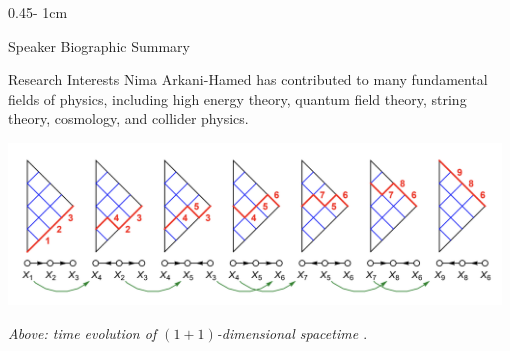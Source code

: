 \documentclass{psuposter}
\begin{document}
\begin{frame}
\begin{columns}[onlytextwidth]
\begin{column}{0.45\textwidth - 1cm}
\begin{block}{Speaker Biographic Summary}
    \end{block}
%
%
%

    \begin{block}{Research Interests}
        Nima Arkani-Hamed has contributed to many fundamental fields of physics, including high energy theory, quantum field theory, string theory, cosmology, and collider physics.
        \begin{center}
	    	\includegraphics[width=0.98\textwidth]{psuposter-images/quiver-nolabel}    		
    	\end{center}
    	\textit{Above: time evolution of $(1+1)$-dimensional spacetime \cite{arkani-hamedCausalDiamondsCluster2020}}.
    \end{block}
\end{column}



\end{columns}
\end{frame}
\end{document}
